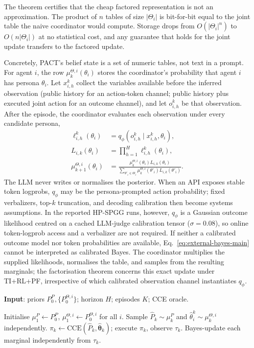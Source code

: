\documentclass{article}
\begin{document}
The theorem certifies that the cheap factored representation is not an approximation. The product of $n$ tables of size $|\Theta_i|$ is bit-for-bit equal to the joint table the naive coordinator would compute. Storage drops from $O(|\Theta_i|^n)$ to $O(n|\Theta_i|)$ at no statistical cost, and any guarantee that holds for the joint update transfers to the factored update.

Concretely, PACT's belief state is a set of numeric tables, not text in a prompt. For agent $i$, the row $\mu_k^{\Theta,i}(\theta_i)$ stores the coordinator's probability that agent $i$ has persona $\theta_i$. Let $x_{i,h}^k$ collect the variables available before the inferred observation (public history for an action-token channel; public history plus executed joint action for an outcome channel), and let $o_{i,h}^k$ be that observation. After the episode, the coordinator evaluates each observation under every candidate persona,
\begin{equation}
\label{eq:external-bayes-main}
\begin{aligned}
\ell_{i,h}^k(\theta_i)
&=q_\phi\!\left(o_{i,h}^k\mid x_{i,h}^k,\theta_i\right),\\
L_{i,k}(\theta_i)
&=\prod_{h=1}^{H}\ell_{i,h}^k(\theta_i),\\
\mu_{k+1}^{\Theta,i}(\theta_i)
&=\frac{\mu_k^{\Theta,i}(\theta_i)L_{i,k}(\theta_i)}{\sum_{\theta'_i\in\Theta_i}\mu_k^{\Theta,i}(\theta'_i)L_{i,k}(\theta'_i)}.
\end{aligned}
\end{equation}
The LLM never writes or normalises the posterior. When an API exposes stable token logprobs, $q_\phi$ may be the persona-prompted action probability; fixed verbalizers, top-$k$ truncation, and decoding calibration then become systems assumptions. In the reported HP-SPGG runs, however, $q_\phi$ is a Gaussian outcome likelihood centred on a cached LLM-judge calibration tensor ($\sigma{=}0.08$), so online token-logprob access and a verbalizer are not required. If neither a calibrated outcome model nor token probabilities are available, Eq.~\eqref{eq:external-bayes-main} cannot be interpreted as calibrated Bayes. The coordinator multiplies the supplied likelihoods, normalises the table, and samples from the resulting marginals; the factorisation theorem concerns this exact update under TI+RL+PF, irrespective of which calibrated observation channel instantiates $q_\phi$.

\begin{algorithm}[t]
\caption{PACT}\label{alg:pact}
\textbf{Input}: priors $P_0^P, \{P_0^{\Theta,i}\}$; horizon $H$; episodes $K$; CCE oracle.\\
\begin{algorithmic}[1]
\STATE Initialise $\mu_1^P\!\gets\! P_0^P$, $\mu_1^{\Theta,i}\!\gets\! P_0^{\Theta,i}$ for all $i$.
  \STATE Sample $\hat P_k\!\sim\!\mu_k^P$ and $\hat\theta_i^k\!\sim\!\mu_k^{\Theta,i}$ independently.
  \STATE $\pi_k\gets\mathrm{CCE}(\hat P_k,\hat{\boldsymbol\theta}_k)$; execute $\pi_k$, observe $\tau_k$.
  \STATE Bayes-update each marginal independently from $\tau_k$.
\ENDFOR
\end{algorithmic}
\end{algorithm}
\end{document}
